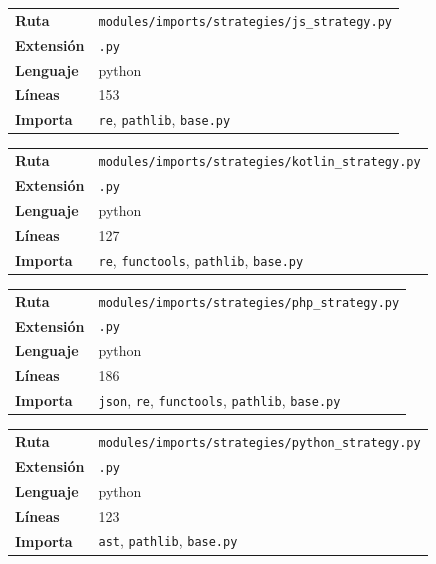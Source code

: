 \documentclass[12pt, a4paper]{report}
\begin{document}
\medskip

\begin{fichabox}
\small
\begin{tabular}{@{}ll@{}}
  \textbf{Ruta} & \texttt{modules/imports/strategies/js\_strategy.py} \\
  \textbf{Extensión} & \texttt{.py} \\
  \textbf{Lenguaje} & python \\
  \textbf{Líneas} & 153 \\
  \textbf{Importa} & \parbox[t]{10cm}{\texttt{re}, \texttt{pathlib}, \texttt{base.py}} \\
\end{tabular}
\end{fichabox}

\medskip

\begin{fichabox}
\small
\begin{tabular}{@{}ll@{}}
  \textbf{Ruta} & \texttt{modules/imports/strategies/kotlin\_strategy.py} \\
  \textbf{Extensión} & \texttt{.py} \\
  \textbf{Lenguaje} & python \\
  \textbf{Líneas} & 127 \\
  \textbf{Importa} & \parbox[t]{10cm}{\texttt{re}, \texttt{functools}, \texttt{pathlib}, \texttt{base.py}} \\
\end{tabular}
\end{fichabox}

\medskip

\begin{fichabox}
\small
\begin{tabular}{@{}ll@{}}
  \textbf{Ruta} & \texttt{modules/imports/strategies/php\_strategy.py} \\
  \textbf{Extensión} & \texttt{.py} \\
  \textbf{Lenguaje} & python \\
  \textbf{Líneas} & 186 \\
  \textbf{Importa} & \parbox[t]{10cm}{\texttt{json}, \texttt{re}, \texttt{functools}, \texttt{pathlib}, \texttt{base.py}} \\
\end{tabular}
\end{fichabox}

\medskip

\begin{fichabox}
\small
\begin{tabular}{@{}ll@{}}
  \textbf{Ruta} & \texttt{modules/imports/strategies/python\_strategy.py} \\
  \textbf{Extensión} & \texttt{.py} \\
  \textbf{Lenguaje} & python \\
  \textbf{Líneas} & 123 \\
  \textbf{Importa} & \parbox[t]{10cm}{\texttt{ast}, \texttt{pathlib}, \texttt{base.py}} \\
\end{tabular}
\end{fichabox}
\end{document}
